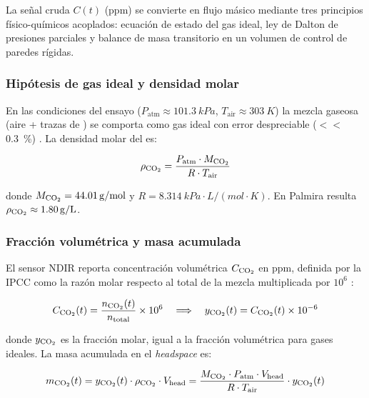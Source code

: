 La señal cruda $C(t)$ (\si{ppm}) se convierte en flujo másico mediante tres principios físico-químicos acoplados: ecuación de estado del gas ideal, ley de Dalton de presiones parciales y balance de masa transitorio en un volumen de control de paredes rígidas.

\subsubsection{Hipótesis de gas ideal y densidad molar}

En las condiciones del ensayo ($P_{\text{atm}} \approx \SI{101.3}{kPa}$, $T_{\text{air}} \approx \SI{303}{K}$) la mezcla gaseosa (aire + trazas de ) se comporta como gas ideal con error despreciable ($<<$\SI{0.3}{\percent}) \parencite{atkinsPhysicalChemistry2014}. La densidad molar del  es:

\begin{equation}
\rho_{\ce{CO2}} = \frac{P_{\text{atm}} \cdot M_{\ce{CO2}}}{R \cdot T_{\text{air}}}
\label{eq:densidad_co2}
\end{equation}

donde $M_{\ce{CO2}} = \SI{44.01}{g/mol}$ y $R = \SI{8.314}{kPa\cdot L/(mol\cdot K)}$. En Palmira resulta $\rho_{\ce{CO2}} \approx \SI{1.80}{g/L}$.

\subsubsection{Fracción volumétrica y masa acumulada}

El sensor NDIR reporta concentración volumétrica $C_{\ce{CO2}}$ en ppm, definida por la IPCC como la razón molar respecto al total de la mezcla multiplicada por $10^6$ \parencite{ipccGuidelinesNationalGreenhouse2006}:

\begin{equation}
C_{\ce{CO2}}(t) = \frac{n_{\ce{CO2}}(t)}{n_{\text{total}}} \times 10^{6}
\quad\Longrightarrow\quad
y_{\ce{CO2}}(t) = C_{\ce{CO2}}(t) \times 10^{-6}
\label{eq:definicion_ppm}
\end{equation}

donde $y_{\ce{CO2}}$ es la fracción molar, igual a la fracción volumétrica para gases ideales. La masa acumulada en el \emph{headspace} es:

\begin{equation}
m_{\ce{CO2}}(t) = y_{\ce{CO2}}(t) \cdot \rho_{\ce{CO2}} \cdot V_{\text{head}}
= \frac{M_{\ce{CO2}} \cdot P_{\text{atm}} \cdot V_{\text{head}}}{R \cdot T_{\text{air}}} \cdot y_{\ce{CO2}}(t)
\label{eq:masa_teorica}
\end{equation}

